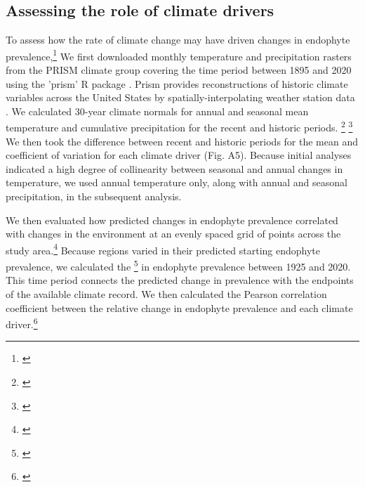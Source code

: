 \documentclass[11pt]{article}
\newcommand{\tom}[2]{{\color{red}{#1}}\footnote{\textit{\color{red}{#2}}}}
\begin{document}
		\subsection*{Assessing the role of climate drivers}
To assess how the rate of climate change may have driven changes in endophyte prevalence,\tom{ we calculated the change in climate between recent (1990 to 2020) and historic (1895 to 1925) periods.}{This is where your hypotheses and predictions in the intro need to come through more clearly. Also, this assumes change has been constant during those periods and does not use most years of data. Could you try estimating a slope for each location? Is this possible?}
We first downloaded monthly temperature and precipitation rasters from the PRISM climate group \citep{daly2013prism} covering the time period between 1895 and 2020 using the 'prism' R package \citep{Rprism2015}. 
Prism provides reconstructions of historic climate variables across the United States by spatially-interpolating weather station data \citep{diLuzio2008constructing}. 
We calculated 30-year climate normals for annual and seasonal mean temperature and cumulative precipitation for the recent and historic periods.
\tom{We used three four-month seasons within the year (Spring: January, February, March, April; Summer: May; June, July, August; Autumn: September, October, November, December). }{I think this needs more biological justification. I can imagine a simpler divion of cool season and warm season.}
\tom{We additionally calculated the coefficient of variation of each climate driver during each period.}{why? and how? was this based on monthly means or sums?}
We then took the difference between recent and historic periods for the mean and coefficient of variation for each climate driver (Fig. A5).
Because initial analyses indicated a high degree of collinearity between seasonal and annual changes in temperature, we used annual temperature only, along with annual and seasonal precipitation, in the subsequent analysis.

We then evaluated how predicted changes in endophyte prevalence correlated with changes in the environment at an evenly spaced grid of points across the study area.\tom{}{Map?} 
Because regions varied in their predicted starting endophyte prevalence, we calculated the \tom{relative change}{calculated how?} in endophyte prevalence between 1925 and 2020. 
This time period connects the predicted change in prevalence with the endpoints of the available climate record.
We then calculated the Pearson correlation coefficient between the relative change in endophyte prevalence and each climate driver.\tom{}{This paragraph should be clearer that you are using predicted prevalence from the model.} 
\end{document}
